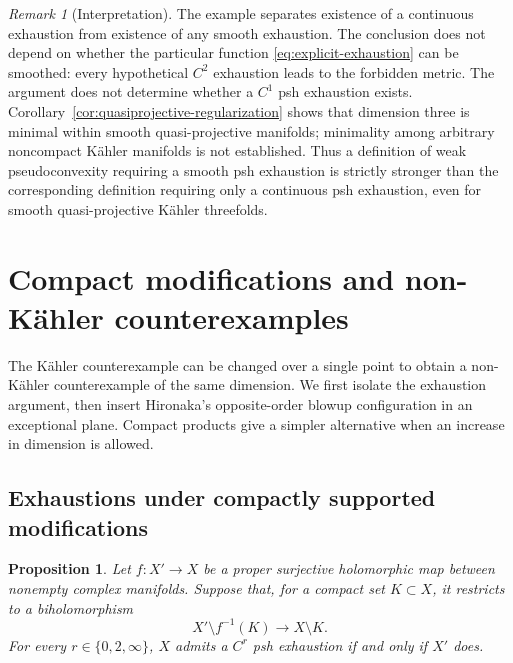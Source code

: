 \documentclass[11pt]{amsart}
\newtheorem{proposition}[theorem]{Proposition}
\theoremstyle{definition}
\theoremstyle{remark}
\newtheorem{remark}[theorem]{Remark}
\numberwithin{equation}{section}
\begin{document}
\begin{remark}[Interpretation]
The example separates existence of a continuous exhaustion from
existence of any smooth exhaustion. The conclusion does not depend on
whether the particular function \eqref{eq:explicit-exhaustion} can be
smoothed: every hypothetical $C^2$ exhaustion leads to the forbidden
metric. The argument does not determine whether a $C^1$ psh
exhaustion exists. Corollary~\ref{cor:quasiprojective-regularization}
shows that dimension three is minimal within smooth quasi-projective
manifolds; minimality among arbitrary noncompact K\"ahler manifolds
is not established. Thus a definition of weak pseudoconvexity
requiring a smooth
psh exhaustion is strictly stronger than the corresponding definition
requiring only a continuous psh exhaustion, even for smooth
quasi-projective K\"ahler threefolds.
\end{remark}

\section{Compact modifications and non-K\"ahler counterexamples}
\label{sec:nonkahler}

The K\"ahler counterexample can be changed over a single point to obtain
a non-K\"ahler counterexample of the same dimension.  We first isolate
the exhaustion argument, then insert Hironaka's opposite-order blowup
configuration in an exceptional plane.  Compact products give a simpler
alternative when an increase in dimension is allowed.

\subsection{Exhaustions under compactly supported modifications}

\begin{proposition}\label{prop:compact-modification}
Let $f:X'\to X$ be a proper surjective holomorphic map between nonempty
complex manifolds.  Suppose that, for a compact set $K\subset X$, it
restricts to a biholomorphism
\[
 X'\setminus f^{-1}(K)\longrightarrow X\setminus K.
\]
For every $r\in\{0,2,\infty\}$, $X$ admits a $C^r$ psh exhaustion
if and only if $X'$ does.
\end{proposition}
\end{document}
